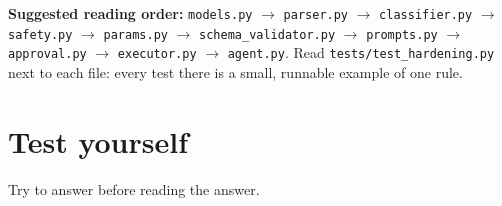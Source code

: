 \documentclass[11pt,a4paper]{article}
\begin{document}
\textbf{Suggested reading order:} \texttt{models.py} $\rightarrow$
\texttt{parser.py} $\rightarrow$ \texttt{classifier.py} $\rightarrow$
\texttt{safety.py} $\rightarrow$ \texttt{params.py} $\rightarrow$
\texttt{schema\_validator.py} $\rightarrow$ \texttt{prompts.py} $\rightarrow$
\texttt{approval.py} $\rightarrow$ \texttt{executor.py} $\rightarrow$
\texttt{agent.py}. Read \texttt{tests/test\_hardening.py} next to each file:
every test there is a small, runnable example of one rule.

\section{Test yourself}
\label{sec:quiz}

Try to answer before reading the answer.
\end{document}
